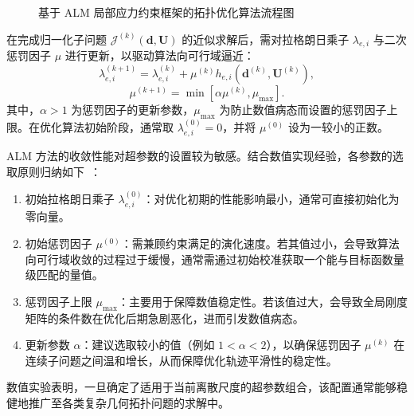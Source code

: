 \begin{figure}[H]
	
	\vspace{0.2cm}
	\caption{基于 ALM 局部应力约束框架的拓扑优化算法流程图}
	\label{fig:alm_flowchart}
\end{figure}

在完成归一化子问题 $\mathcal{J}^{(k)}(\boldsymbol{d}, \boldsymbol{U})$ 的近似求解后，需对拉格朗日乘子 $\lambda_{e,i}$ 与二次惩罚因子 $\mu$ 进行更新，以驱动算法向可行域逼近：
\begin{equation} \label{eq:ch4_multiplier_update}
	\lambda_{e,i}^{(k+1)} = \lambda_{e,i}^{(k)} + \mu^{(k)} h_{e,i}(\boldsymbol{d}^{(k)}, \boldsymbol{U}^{(k)}),
\end{equation}
\begin{equation} \label{eq:ch4_penalty_update}
	\mu^{(k+1)} = \min \left[ \alpha \mu^{(k)}, \mu_{\max} \right].
\end{equation}
其中，$\alpha > 1$ 为惩罚因子的更新参数，$\mu_{\max}$ 为防止数值病态而设置的惩罚因子上限。在优化算法初始阶段，通常取 $\lambda_{e,i}^{(0)} = 0$，并将 $\mu^{(0)}$ 设为一较小的正数。

ALM 方法的收敛性能对超参数的设置较为敏感。结合数值实现经验，各参数的选取原则归纳如下~\cite{giraldo-londonoPolyStressMatlabImplementation2021}：
\begin{enumerate}
	\item 初始拉格朗日乘子 $\lambda_{e,i}^{(0)}$：对优化初期的性能影响最小，通常可直接初始化为零向量。
	
	\item 初始惩罚因子 $\mu^{(0)}$：需兼顾约束满足的演化速度。若其值过小，会导致算法向可行域收敛的过程过于缓慢，通常需通过初始校准获取一个能与目标函数量级匹配的量值。
	
	\item 惩罚因子上限 $\mu_{\max}$：主要用于保障数值稳定性。若该值过大，会导致全局刚度矩阵的条件数在优化后期急剧恶化，进而引发数值病态。
	
	\item 更新参数 $\alpha$：建议选取较小的值（例如 $1 < \alpha < 2$），以确保惩罚因子 $\mu^{(k)}$ 在连续子问题之间温和增长，从而保障优化轨迹平滑性的稳定性。
\end{enumerate}
数值实验表明，一旦确定了适用于当前离散尺度的超参数组合，该配置通常能够稳健地推广至各类复杂几何拓扑问题的求解中。


